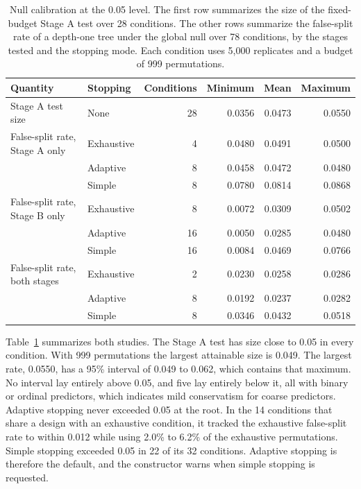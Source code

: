 \documentclass[article]{jss}
\begin{document}
\begin{table}[t!]
\centering
\small
\begin{tabular}{@{}llrrrr@{}}
\toprule
Quantity & Stopping & Conditions & Minimum & Mean & Maximum \\ \midrule
Stage A test size & None & 28 & 0.0356 & 0.0473 & 0.0550 \\ \midrule
False-split rate, Stage A only & Exhaustive & 4 & 0.0480 & 0.0491 & 0.0500 \\
 & Adaptive & 8 & 0.0458 & 0.0472 & 0.0480 \\
 & Simple & 8 & 0.0780 & 0.0814 & 0.0868 \\
False-split rate, Stage B only & Exhaustive & 8 & 0.0072 & 0.0309 & 0.0502 \\
 & Adaptive & 16 & 0.0050 & 0.0285 & 0.0480 \\
 & Simple & 16 & 0.0084 & 0.0469 & 0.0766 \\
False-split rate, both stages & Exhaustive & 2 & 0.0230 & 0.0258 & 0.0286 \\
 & Adaptive & 8 & 0.0192 & 0.0237 & 0.0282 \\
 & Simple & 8 & 0.0346 & 0.0432 & 0.0518 \\
\bottomrule
\end{tabular}
\caption{Null calibration at the 0.05 level. The first row summarizes the size
of the fixed-budget Stage A test over 28 conditions. The other rows summarize
the false-split rate of a depth-one tree under the global null over 78
conditions, by the stages tested and the stopping mode. Each condition uses
5,000 replicates and a budget of 999 permutations.}
\label{tab:calibration-summary}
\end{table}

Table~\ref{tab:calibration-summary} summarizes both studies. The Stage A test
has size close to 0.05 in every condition. With 999 permutations the largest
attainable size is 0.049. The largest rate, 0.0550, has a 95\% interval of
0.049 to 0.062, which contains that maximum. No interval lay entirely above 0.05, and five lay entirely
below it, all with binary or ordinal predictors, which indicates mild
conservatism for coarse predictors. Adaptive stopping never exceeded 0.05 at
the root. In the 14 conditions that share a design with an exhaustive
condition, it tracked the exhaustive false-split rate to within 0.012 while
using 2.0\% to 6.2\% of the exhaustive permutations. Simple stopping exceeded
0.05 in 22 of its 32 conditions. Adaptive stopping is therefore the default,
and the constructor warns when simple stopping is requested.
\end{document}
